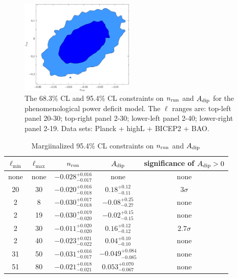 \documentclass[11pt]{article}
\def \halffigwidth{0.48\textwidth}
\begin{document}
\begin{figure}
  \includegraphics[width = \halffigwidth]{ldip2to19_nrun_dipamp_2D.pdf} 
  \caption{The 68.3\% CL and 95.4\% CL constraints on $n_{\rm run}$ and $A_{\rm dip}$ for the phenomenological power deficit model. The $\ell$ ranges are: top-left panel 20-30;  top-right panel 2-30; lower-left panel 2-40; lower-right panel 2-19. Data sets: Planck + highL + BICEP2 + BAO. \label{fig:nrunadip}}
\end{figure}


\begin{table}
\caption{Margiinalized 95.4\% CL constraints on $n_{\rm run}$ and $A_{\rm dip}$ \label{tbl:nrunadip}}
\centering
\begin{tabular}{ccccc}
\hline
\hline
$\ell_{\min}$ & $\ell_{\max}$ & $n_{\rm run}$ & $A_{\rm dip}$ & significance of $A_{\rm dip}>0$\\
\hline
none & none & $-0.028^{+0.016}_{-0.017}$ & none & none \\
20   & 30 & $-0.020^{+0.016}_{-0.018}$ & $0.18^{+0.12}_{-0.11}$ & $3\sigma$\\
2 & 8 & $-0.030^{+0.017}_{-0.018}$  & $-0.08^{+0.25}_{-0.27}$ & none \\
2 & 19 & $-0.030^{+0.019}_{-0.020}$ &    $-0.02^{+0.15}_{-0.15}$ & none \\
2 & 30 &  $-0.011^{+0.020}_{-0.020}$   & $0.16^{+0.12}_{-0.12}$ & $2.7\sigma$\\
2 & 40 & $-0.023^{+0.021}_{-0.022}$  &  $0.04^{+0.10}_{-0.10}$ & none \\
31 & 50 & $-0.031^{+0.016}_{-0.017}$  & $-0.049^{+0.084}_{-0.085}$ & none\\
51 & 80 & $-0.021^{+0.018}_{-0.021}$  & $0.053^{+0.070}_{-0.067}$ & none\\
\hline
\end{tabular}
\end{table}
\end{document}
